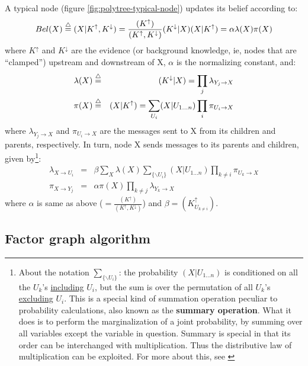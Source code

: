 A typical node (figure \ref{fig:polytree-typical-node}) updates its belief according to:
\begin{equation}
Bel(X) \stackrel{\triangle}{=} (X|K^\uparrow,K^\downarrow) = \frac{(K^\uparrow)}{(K^\uparrow,K^\downarrow)}
   (K^\downarrow|X)(X|K^\uparrow) = \alpha \lambda(X) \pi(X)
\end{equation}
where $K^\uparrow$ and $K^\downarrow$ are the evidence (or background knowledge, ie, nodes that
 are ``clamped'') upstream and downstream of X, $\alpha$ is the normalizing constant, and:
\begin{eqnarray}
\lambda(X) &\stackrel{\triangle}{=}& (K^\downarrow|X) = \prod_j \lambda_{Y_j \rightarrow X} \\
    \pi(X) &\stackrel{\triangle}{=}& (X|K^\uparrow) = \sum_{U_i} (X|U_{1...n}) \prod_i \pi_{U_i \rightarrow X}
\end{eqnarray}
where $\lambda_{Y_j \rightarrow X}$ and $\pi_{U_i \rightarrow X}$ are the messages sent to X
from its children and parents, respectively.  In turn, node X sends messages to its parents
and children, given by\footnote{About the notation $\sum_{\{\backslash U_i\}}$: the probability
 $(X|U_{1...n})$ is conditioned on all the $U_k$'s \underline{including} $U_i$, but the sum is
 over the permutation of all $U_k$'s \underline{excluding} $U_i$. This is a special kind of
 summation operation peculiar to probability calculations, also known as the \textbf{summary
 operation}.  What it does is to perform the marginalization of a joint probability, by summing
 over all variables except the variable in question. Summary is special in that its order
 can be interchanged with multiplication.  Thus the distributive law of multiplication can be
 exploited. For more about this, see \citep*{Kschischang2001}}:
\begin{eqnarray}
\lambda_{X \rightarrow U_i} &=& \beta \sum_X \lambda(X) \sum_{\{\backslash U_i\}} (X|U_{1...n}) 
         \prod_{k \neq i} \pi_{U_k \rightarrow X} \\
\pi_{X \rightarrow Y_j} &=& \alpha \pi(X) \prod_{k \neq j} \lambda_{Y_k \rightarrow X}
\end{eqnarray}
where $\alpha$ is same as above ($= \frac{ (K^\uparrow) }{ (K^\uparrow,K^\downarrow) } $) and
 $\beta = (K^\uparrow_{U_{k \neq i}})$.

\subsection{Factor graph algorithm}

